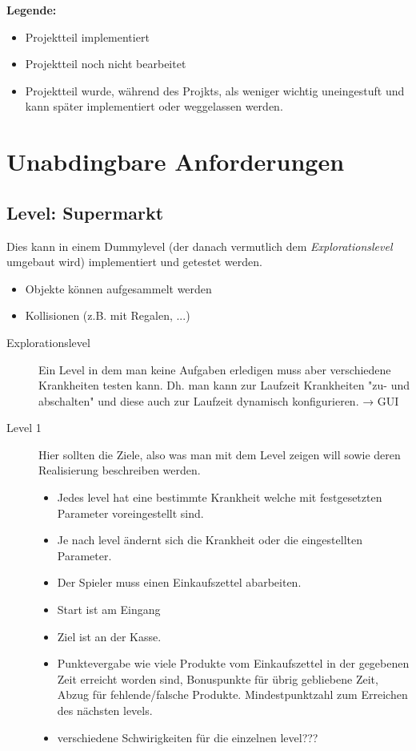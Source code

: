\documentclass[a4paper, 11pt]{scrartcl}
\title{\documenttitle}
\author{\authors}
\date{\dateversion}
\newcommand{\fertig}{\color{ForestGreen}}
\newcommand{\unwichtig}{\color{Gray}}
\begin{document}
\maketitle

{\bfseries Legende:}
\begin{itemize}
    \item {\fertig Projektteil implementiert}
    \item {Projektteil noch nicht bearbeitet}
    \item {\unwichtig Projektteil wurde, während des Projkts, als weniger
    wichtig uneingestuft und kann später implementiert oder weggelassen werden.}
\end{itemize}

\section{Unabdingbare Anforderungen}
\subsection{Level: Supermarkt}
Dies kann in einem Dummylevel (der danach vermutlich dem
\emph{Explorationslevel} umgebaut wird) implementiert und getestet werden.
\begin{itemize}
    \item Objekte können aufgesammelt werden
    \item Kollisionen (z.B. mit Regalen, ...)
\end{itemize}
%
%
\begin{description}
    \item[Explorationslevel]
    Ein Level in dem man keine Aufgaben erledigen muss aber verschiedene Krankheiten testen kann.
    Dh. man kann zur Laufzeit Krankheiten "zu- und abschalten" und diese auch zur Laufzeit dynamisch konfigurieren. → GUI
    \item[Level 1]
    Hier sollten die Ziele, also was man mit dem Level zeigen will sowie deren Realisierung beschreiben werden.\\
    \begin{itemize}
        \item Jedes level hat eine bestimmte Krankheit welche mit festgesetzten Parameter voreingestellt sind.
        \item Je nach level ändernt sich die Krankheit oder die eingestellten Parameter.
        \item Der Spieler muss einen Einkaufszettel abarbeiten.
        \item Start ist am Eingang
        \item Ziel ist an der Kasse.
        \item Punktevergabe wie viele Produkte vom Einkaufszettel in der gegebenen Zeit erreicht worden sind, Bonuspunkte für übrig gebliebene Zeit, Abzug für fehlende/falsche Produkte. Mindestpunktzahl zum Erreichen des nächsten levels.
        \item verschiedene Schwirigkeiten für die einzelnen level???
    \end{itemize}
\end{description}
\end{document}
